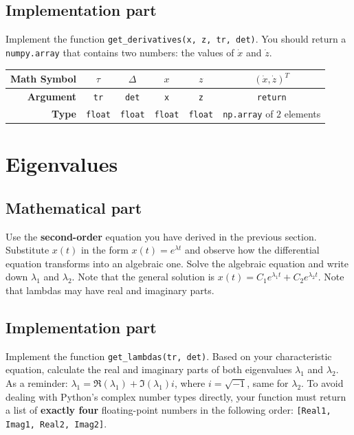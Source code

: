 \documentclass[11pt]{article}
\begin{document}
\subsection*{Implementation part}

Implement the function \lstinline|get_derivatives(x, z, tr, det)|. You should return a \lstinline|numpy.array| that contains two numbers: the values of $\dot{x}$ and $\dot{z}$.

\begin{center}
\renewcommand{\arraystretch}{2.0}
\begin{tabular}{r | c | c | c | c | c}
\toprule
\textbf{Math Symbol} & $\tau$ & $\Delta$ & $x$ & $z$ & $(\dot{x},\dot{z})^T$ \\ \midrule
\textbf{Argument} & \lstinline|tr| & \lstinline|det| & \lstinline|x| & \lstinline|z| & \lstinline|return| \\ \midrule
\textbf{Type} & \lstinline|float| & \lstinline|float| & \lstinline|float| & \lstinline|float| & \lstinline|np.array| of $2$ elements \\
\bottomrule
\end{tabular}
\end{center}


\section*{Eigenvalues}

\subsection*{Mathematical part}

Use the \textbf{second-order} equation you have derived in the previous section. Substitute $x(t)$ in the form $x(t) = e^{\lambda t}$ and observe how the differential equation transforms into an algebraic one. Solve the algebraic equation and write down $\lambda_1$ and $\lambda_2$. Note that the general solution is $x(t) = C_1 e^{\lambda_1 t} + C_2 e^{\lambda_2 t}$. Note that lambdas may have real and imaginary parts.

\subsection*{Implementation part}

Implement the function \lstinline|get_lambdas(tr, det)|. Based on your characteristic equation, calculate the real and imaginary parts of both eigenvalues $\lambda_1$ and $\lambda_2$. As a reminder: $\lambda_1 = \Re(\lambda_1) + \Im(\lambda_1) i$, where $i = \sqrt{-1}$, same for $\lambda_2$. To avoid dealing with Python's complex number types directly, your function must return a list of \textbf{exactly four} floating-point numbers in the following order: \lstinline|[Real1, Imag1, Real2, Imag2]|.
\end{document}
